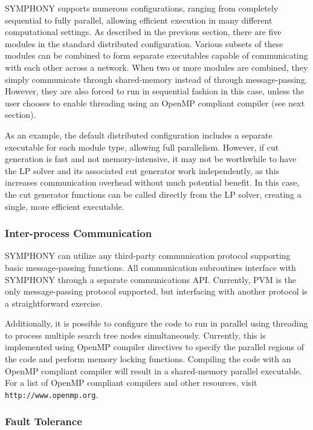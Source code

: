 SYMPHONY supports numerous configurations, ranging from completely
sequential to fully parallel, allowing efficient execution in many
different computational settings. As described in the previous
section, there are five modules in the standard distributed
configuration. Various subsets of these modules can be
combined to form separate executables capable of communicating
with each other across a network. When two or more modules are combined,
they simply communicate through shared-memory instead of through
message-passing. However, they are also forced to run in sequential
fashion in this case, unless the user chooses to enable threading
using an OpenMP compliant compiler (see next section). 

As an example, the default distributed configuration includes a
separate executable for each module type, allowing full parallelism.
However, if cut generation is fast and not memory-intensive,
it may not be worthwhile to have the LP solver and its associated cut
generator work independently, as this increases communication
overhead without much potential benefit. In this case, the cut
generator functions can be called directly from the LP solver,
creating a single, more efficient executable.

\subsubsection{Inter-process Communication}

SYMPHONY can utilize any third-party communication protocol supporting
basic message-passing functions. All communication subroutines
interface with SYMPHONY through a separate communications API.
Currently, PVM \cite{pvm} is the only message-passing protocol supported, but
interfacing with another protocol is a straightforward exercise.

Additionally, it is possible to configure the code to run in parallel
using threading to process multiple search tree nodes simultaneously.
Currently, this is implemented using OpenMP compiler directives to
specify the parallel regions of the code and perform memory locking
functions. Compiling the code with an OpenMP compliant compiler will
result in a shared-memory parallel executable. For a list of OpenMP
compliant compilers and other resources, visit {\tt http://www.openmp.org}.

\subsubsection{Fault Tolerance}
\label{fault-tolerance} 

